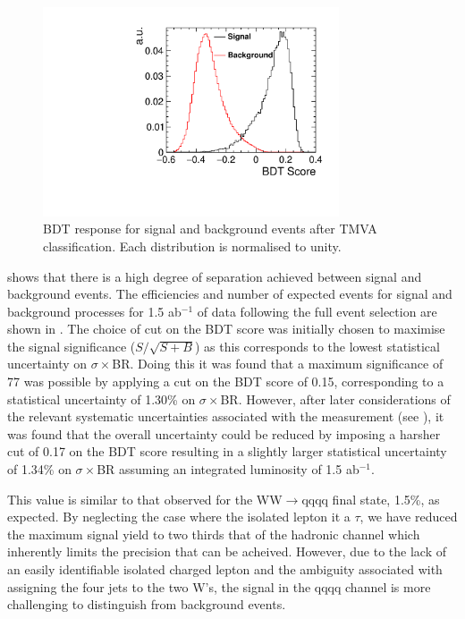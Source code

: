 \begin{figure}
  \centering
  \includegraphics[width=0.78\textwidth,keepaspectratio]{HiggsAnalysis/figures/bdtscore}
  \caption[Classifier BDT response]{BDT response for signal and background events after TMVA classification. Each distribution is normalised to unity.}
  \label{bdt}
\end{figure}

 shows that there is a high degree of separation achieved between signal and background events. The efficiencies and number of expected events for signal and background processes for 1.5 ab$^{-1}$ of data following the full event selection are shown in . The choice of cut on the BDT score was initially chosen to maximise the signal significance ($S/\sqrt{S+B}$) as this corresponds to the lowest statistical uncertainty on $\sigma\times$BR. Doing this it was found that a maximum significance of 77 was possible by applying a cut on the BDT score of 0.15, corresponding to a statistical uncertainty of 1.30\% on $\sigma\times$BR. However, after later considerations of the relevant systematic uncertainties associated with the measurement (see ), it was found that the overall uncertainty could be reduced by imposing a harsher cut of 0.17 on the BDT score resulting in a slightly larger statistical uncertainty of 1.34\% on $\sigma\times$BR assuming an integrated luminosity of 1.5 ab$^{-1}$. 

This value is similar to that observed for the WW$\rightarrow$qqqq final state, 1.5\%, as expected. By neglecting the case where the isolated lepton it a $\tau$, we have reduced the maximum signal yield to two thirds that of the hadronic channel which inherently limits the precision that can be acheived. However, due to the lack of an easily identifiable isolated charged lepton and the ambiguity associated with assigning the four jets to the two W's, the signal in the qqqq channel is more challenging to distinguish from background events.


